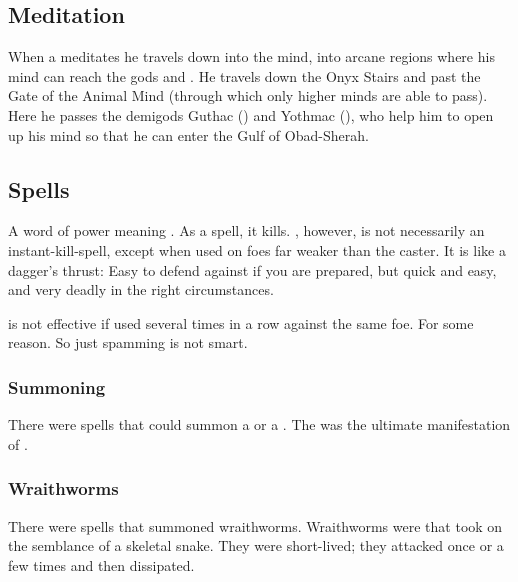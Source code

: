 \subsection{Meditation}
When a \rethyax meditates he travels down into the mind, into arcane regions where his mind can reach the gods and \daemons.
He travels down the Onyx Stairs and past the Gate of the Animal Mind (through which only higher minds are able to pass). 
Here he passes the demigods Guthac (\Venus) and Yothmac (\Mars), who help him to open up his mind so that he can enter the Gulf of Obad-Sherah.









\subsection{Spells}
\begin{gloss}
  A  word of power meaning . 
  As a spell, it kills. 
  , however, is not necessarily an instant-kill-spell, except when used on foes far weaker than the caster. 
  It is like a dagger's thrust: 
  Easy to defend against if you are prepared, but quick and easy, and very deadly in the right circumstances. 
  
   is not effective if used several times in a row against the same foe. 
  For some reason. 
  So just spamming  is not smart. 
\end{gloss}





\subsubsection{Summoning}
There were spells that could summon a \malgryph or a \firesalamander. 
The \firesalamander was the ultimate manifestation of . 





\subsubsection{Wraithworms}
There were spells that summoned wraithworms. 
Wraithworms were \daemons that took on the semblance of a skeletal snake. 
They were short-lived; they attacked once or a few times and then dissipated. 

